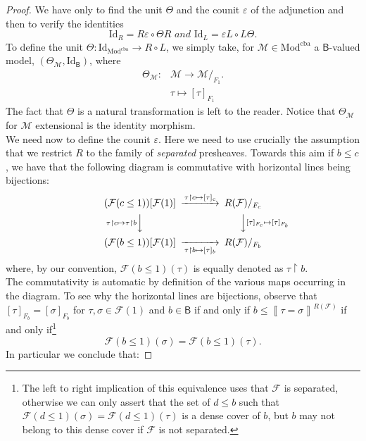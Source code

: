 \documentclass[11pt]{amsart}
\newcommand{\Mod}{\textrm{Mod}}
\newcommand{\F}{\mathcal{F}}
\newcommand{\Id}{\textrm{Id}}
\newcommand{\modxx}{\Mod^{\textrm{cba}}}
\theoremstyle{plain}
\theoremstyle{definition}
\theoremstyle{plain}
\theoremstyle{remark}
\newcommand{\M}{\mathcal{M}}
\newcommand{\bool}[1]{\mathsf{#1}}
\newcommand{\Qp}[1]{\left\llbracket #1 \right\rrbracket}
\newcommand{\0}{\mathsf{0}}
\renewcommand{\1}{\mathsf{1}}
\renewcommand{\2}{\mathsf{2}}
\theoremstyle{definition}
\begin{document}
\begin{proof}
We have only to find the unit $\Theta$ and the counit $\varepsilon$ of the adjunction and then to verify the identities 
\begin{equation}
\label{un:coun}
\Id_R=R\varepsilon\circ\Theta R\textit{ and }\Id_L=\varepsilon L\circ L\Theta.
\end{equation}
To define the unit $\Theta: \Id_{\modxx}\to R\circ L$, we simply take, for $\M\in\modxx$ a $\bool{B}$-valued model, $(\Theta_\M,\Id_{\bool{B}})$, where
\begin{align*}
\Theta_\M:&\M\to\M/_{F_1}.\\
&\tau\mapsto[\tau]_{F_1}
\end{align*}
The fact that $\Theta$ is a natural transformation is left to the reader. Notice that $\Theta_\M$ for $\M$ extensional is the identity morphism.\\
We need now to define the counit $\varepsilon$. Here we need to use crucially the assumption that we restrict 
$R$ to the family of \emph{separated} presheaves. Towards this aim  
if $b\leq c$, we have
that the following diagram is commutative with horizontal lines being bijections:
\begin{equation}\label{comdgm:counitLXRX}
\begin{CD}
(\F(c\leq1))[\F(1)] @>\tau\restriction c\mapsto[\tau]_{c}>>  R(\F)/_{F_c}\\
@V{\tau\restriction c\mapsto\tau\restriction b}VV              @VV{[\tau]_{F_c}\mapsto [\tau]_{F_b}}V\\
(\F(b\leq 1))[\F(1)]@>>\tau\restriction b\mapsto[\tau]_{b}>  R(\F)/_{F_b}\\
\end{CD}
\end{equation}
where, by our convention, $\F(b\leq 1)(\tau)$ is equally denoted as $\tau\restriction b$.\\
The commutativity is automatic by definition of the various maps occurring in the diagram.
To see why the horizontal lines are bijections, observe that
$[\tau]_{F_b}=[\sigma]_{F_b}$ for $\tau,\sigma\in\F(1)$ and $b\in\bool{B}$
if and only if $b\leq\Qp{\tau=\sigma}^{R(\F)}$ if and only if\footnote{The left to right implication of this equivalence uses that
$\F$ is separated, otherwise we can only assert that the set of $d\leq b$ such that $\F(d\leq1)(\sigma)= \F(d\leq 1)(\tau)$
is a dense cover of $b$, but $b$ may not belong to this dense cover if $\F$ is not separated.}
\[
\F(b\leq1)(\sigma)= \F(b\leq 1)(\tau).
\]
In particular we conclude that:

\end{proof}
\end{document}
